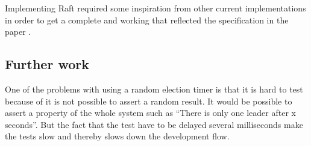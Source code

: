 Implementing Raft required some inspiration from other current implementations in order to get a complete and working that reflected the specification in the paper \cite{Raft}. 
\subsection{Further work}

One of the problems with using a random election timer is that it is hard to test because of it is not possible to assert a random result. It would be possible to assert a property of the whole system such as ``There is only one leader after x seconds''. But the fact that the test have to be delayed several milliseconds make the tests slow and thereby slows down the development flow.




